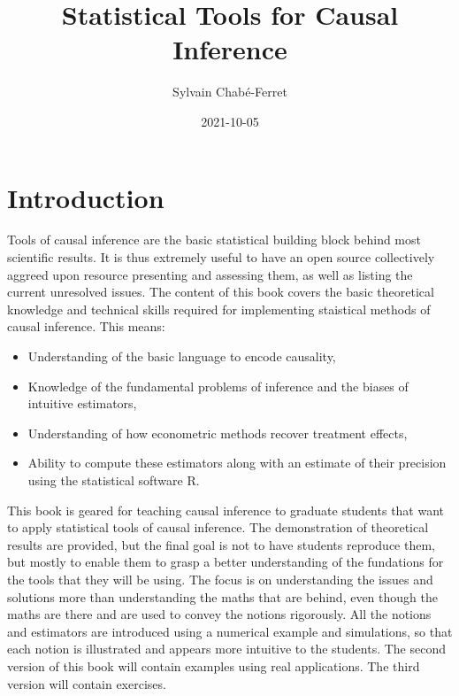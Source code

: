 \documentclass[
]{book}
\title{Statistical Tools for Causal Inference}
\author{Sylvain Chabé-Ferret}
\date{2021-10-05}
\providecommand{\tightlist}{%
  \setlength{\itemsep}{0pt}\setlength{\parskip}{0pt}}
\theoremstyle{definition}
\theoremstyle{definition}
\theoremstyle{definition}
\theoremstyle{definition}
\theoremstyle{remark}
\begin{document}
\maketitle

{
\setcounter{tocdepth}{0}
\tableofcontents
}
\hypertarget{introduction}{%
\chapter*{Introduction}\label{introduction}}

Tools of causal inference are the basic statistical building block behind most scientific results.
It is thus extremely useful to have an open source collectively aggreed upon resource presenting and assessing them, as well as listing the current unresolved issues.
The content of this book covers the basic theoretical knowledge and technical skills required for implementing staistical methods of causal inference.
This means:

\begin{itemize}
\tightlist
\item
  Understanding of the basic language to encode causality,
\item
  Knowledge of the fundamental problems of inference and the biases of intuitive estimators,
\item
  Understanding of how econometric methods recover treatment effects,
\item
  Ability to compute these estimators along with an estimate of their precision using the statistical software R.
\end{itemize}

This book is geared for teaching causal inference to graduate students that want to apply statistical tools of causal inference.
The demonstration of theoretical results are provided, but the final goal is not to have students reproduce them, but mostly to enable them to grasp a better understanding of the fundations for the tools that they will be using.
The focus is on understanding the issues and solutions more than understanding the maths that are behind, even though the maths are there and are used to convey the notions rigorously.
All the notions and estimators are introduced using a numerical example and simulations, so that each notion is illustrated and appears more intuitive to the students.
The second version of this book will contain examples using real applications.
The third version will contain exercises.
\end{document}
